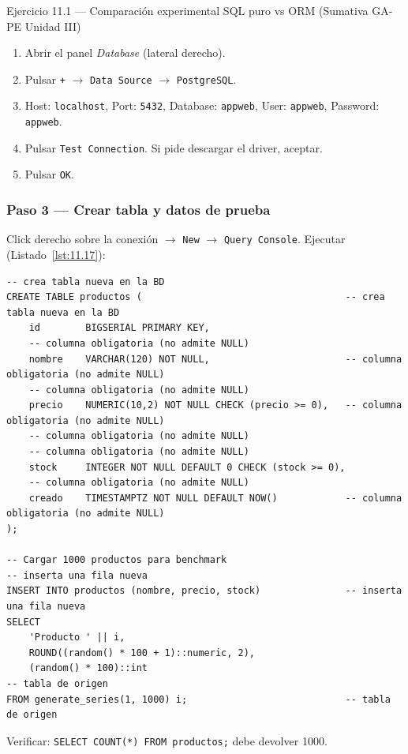 \begin{cajaejercicio}{Ejercicio 11.1 --- Comparación experimental SQL puro vs ORM (Sumativa GA-PE Unidad III)}
\begin{enumerate}
\item Abrir el panel \emph{Database} (lateral derecho).
\item Pulsar \texttt{+} $\rightarrow$ \texttt{Data Source}
$\rightarrow$ \texttt{PostgreSQL}.
\item Host: \texttt{localhost}, Port: \texttt{5432},
Database: \texttt{appweb}, User: \texttt{appweb}, Password:
\texttt{appweb}.
\item Pulsar \texttt{Test Connection}. Si pide descargar el driver,
aceptar.
\item Pulsar \texttt{OK}.
\end{enumerate}

\subsubsection*{Paso 3 --- Crear tabla y datos de prueba}

Click derecho sobre la conexión $\rightarrow$ \texttt{New}
$\rightarrow$ \texttt{Query Console}. Ejecutar (Listado~\ref{lst:11.17}):

\begin{lstlisting}[style=sql,numbers=none,caption={Ejemplo de SQL},label=lst:11.17]
-- crea tabla nueva en la BD
CREATE TABLE productos (                                    -- crea tabla nueva en la BD
    id        BIGSERIAL PRIMARY KEY,
    -- columna obligatoria (no admite NULL)
    nombre    VARCHAR(120) NOT NULL,                        -- columna obligatoria (no admite NULL)
    -- columna obligatoria (no admite NULL)
    precio    NUMERIC(10,2) NOT NULL CHECK (precio >= 0),   -- columna obligatoria (no admite NULL)
    -- columna obligatoria (no admite NULL)
    -- columna obligatoria (no admite NULL)
    stock     INTEGER NOT NULL DEFAULT 0 CHECK (stock >= 0),
    -- columna obligatoria (no admite NULL)
    creado    TIMESTAMPTZ NOT NULL DEFAULT NOW()            -- columna obligatoria (no admite NULL)
);

-- Cargar 1000 productos para benchmark
-- inserta una fila nueva
INSERT INTO productos (nombre, precio, stock)               -- inserta una fila nueva
SELECT
    'Producto ' || i,
    ROUND((random() * 100 + 1)::numeric, 2),
    (random() * 100)::int
-- tabla de origen
FROM generate_series(1, 1000) i;                            -- tabla de origen
\end{lstlisting}

Verificar: \texttt{SELECT COUNT(*) FROM productos;} debe devolver 1000.


\end{cajaejercicio}
